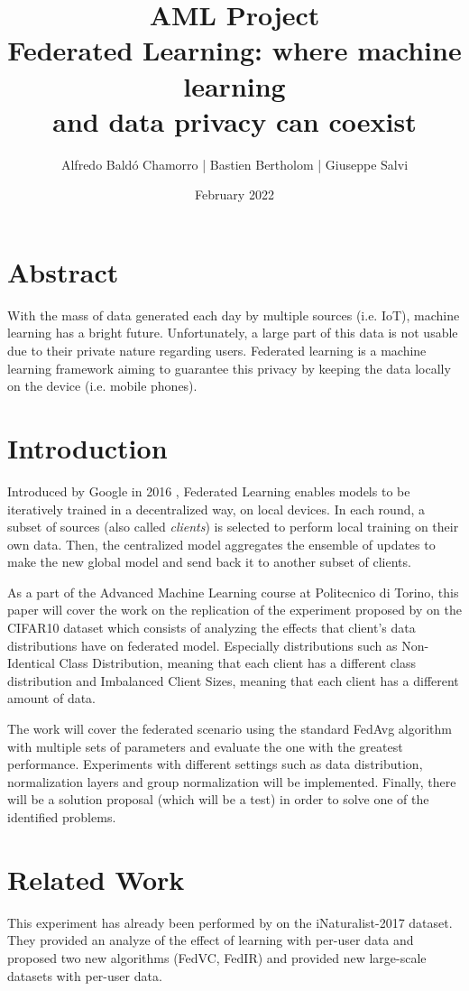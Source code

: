 \documentclass[twocolumn]{article}
\title{\textbf{AML Project}
\\Federated Learning: where machine learning \\and data privacy can coexist
}
\author{
Alfredo Baldó Chamorro | 
Bastien Bertholom |
Giuseppe Salvi
}
\date{February 2022}
\begin{document}
\maketitle

\section{Abstract}
With the mass of data generated each day by multiple sources (i.e. IoT), machine learning has a bright future. Unfortunately, a large part of this data is not usable due to their private nature regarding users. Federated learning is a machine learning framework aiming to guarantee this privacy by keeping the data locally on the device (i.e. mobile phones).
\section{Introduction} %

Introduced by Google in 2016 \cite{DBLP:journals/corr/KonecnyMYRSB16}, Federated Learning enables models to be iteratively trained in a decentralized way, on local devices. In each round, a subset of sources (also called \emph{clients}) is selected to perform local training on their own data. Then, the centralized model aggregates the ensemble of updates to make the new global model and send back it to another subset of clients. 

As a part of the Advanced Machine Learning course at Politecnico di Torino, this paper will cover the work on the replication of the experiment proposed by \cite{DBLP:journals/corr/abs-2003-08082} on the CIFAR10 dataset which consists of analyzing the effects that client's data distributions have on federated model. Especially distributions such as Non-Identical Class Distribution, meaning that each client has a different class distribution and Imbalanced Client Sizes, meaning that each client has a different amount of data. 

The work will cover the federated scenario using the standard FedAvg algorithm with multiple sets of parameters and evaluate the one with the greatest performance. Experiments with different settings such as data distribution, normalization layers and group normalization will be implemented. Finally, there will be a solution proposal (which will be a test) in order to solve one of the identified problems.

\section{Related Work} %
This experiment has already been performed by \cite{DBLP:journals/corr/abs-2003-08082}  on the iNaturalist-2017 dataset. They provided an analyze of the effect of learning with per-user data and proposed two new algorithms (FedVC, FedIR) and provided new large-scale datasets with per-user data.
\end{document}

